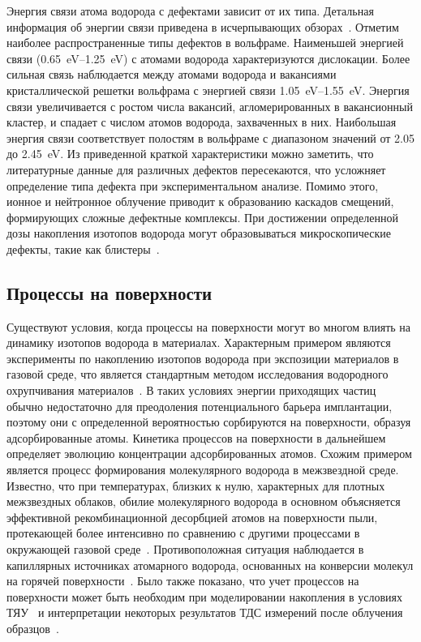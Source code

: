 Энергия связи атома водорода с дефектами зависит от их типа. Детальная информация об энергии связи приведена в исчерпывающих обзорах~\cite{Ogorodnikova2015,Li2020,Persianova2024}. Отметим наиболее распространенные типы дефектов в вольфраме. Наименьшей энергией связи (\SIrange{0.65}{1.25}{\electronvolt}) с атомами водорода характеризуются дислокации. Более сильная связь наблюдается между атомами водорода и вакансиями кристаллической решетки вольфрама с энергией связи \SIrange{1.05}{1.55}{\electronvolt}. Энергия связи увеличивается с ростом числа вакансий, агломерированных в вакансионный кластер, и спадает с числом атомов водорода, захваченных в них. Наибольшая энергия связи соответствует полостям в вольфраме с диапазоном значений от \num{2.05} до \SI{2.45}{\electronvolt}. Из приведенной краткой характеристики можно заметить, что литературные данные для различных дефектов пересекаются, что усложняет определение типа дефекта при экспериментальном анализе. Помимо этого, ионное и нейтронное облучение приводит к образованию каскадов смещений, формирующих сложные дефектные комплексы. При достижении определенной дозы накопления изотопов водорода могут образовываться микроскопические дефекты, такие как блистеры~\cite{Wang2001}.

\subsection{Процессы на поверхности}\label{subsec:ch1/sec4/subsec3}

Существуют условия, когда процессы на поверхности могут во многом влиять на динамику изотопов водорода в материалах. Характерным примером являются эксперименты по накоплению изотопов водорода при экспозиции материалов в газовой среде, что является стандартным методом исследования водородного охрупчивания материалов~\cite{Briant2002,Louthan2008}. В таких условиях энергии приходящих частиц обычно недостаточно для преодоления потенциального барьера имплантации, поэтому они с определенной вероятностью сорбируются на поверхности, образуя адсорбированные атомы. Кинетика процессов на поверхности в дальнейшем определяет эволюцию концентрации адсорбированных атомов. Схожим примером является процесс формирования молекулярного водорода в межзвездной среде. Известно, что при температурах, близких к нулю, характерных для плотных межзвездных облаков, обилие молекулярного водорода в основном объясняется эффективной рекомбинационной десорбцией атомов на поверхности пыли, протекающей более интенсивно по сравнению с другими процессами в окружающей газовой среде~\cite{Katz1999, Perets2005, Hama2013}. Противоположная ситуация наблюдается в капиллярных источниках атомарного водорода, основанных на конверсии молекул на горячей поверхности~\cite{Tschersich2000, Tschersich2008}. Было также показано, что учет процессов на поверхности может быть необходим при моделировании накопления в условиях ТЯУ~\cite{Guterl2019} и интерпретации некоторых результатов ТДС измерений после облучения образцов~\cite{Hodille2017, Matveev2018}. 

